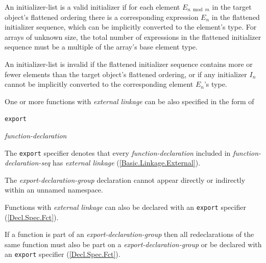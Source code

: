 \p An initializer-list is a valid initializer if for each element
\(E_{n \bmod m}\) in the target object's flattened ordering there is a
corresponding expression \(E_n\) in the flattened initializer sequence, which
can be implicitly converted to the element's type. For arrays of unknown size,
the total number of expressions in the flattened initializer sequence  must be a
multiple of the array's base element type.

\p An initializer-list is invalid if the flattened initializer sequence contains
more or fewer elements than the target object's flattened ordering, or if any
initializer \(I_n\) cannot be implicitly converted to the corresponding element
\(E_n\)'s type.



\p One or more functions with \textit{external linkage} can be also specified in the form of

\begin{grammar}
  \br
  \texttt{export} \terminal{\{}  \terminal{\}}\br

  \br
  \textit{function-declaration} 
\end{grammar}

\p The \texttt{export} specifier denotes that every \textit{function-declaration} included in \textit{function-declaration-seq} has \textit{external linkage} (\ref{Basic.Linkage.External}).

\p The \textit{export-declaration-group} declaration cannot appear directly or indirectly within an unnamed namespace.

\p Functions with \textit{external linkage} can also be declared with an \texttt{export} specifier (\ref{Decl.Spec.Fct}).

\p If a function is part of an \textit{export-declaration-group} then all redeclarations of the same function must also be part on a \textit{export-declaration-group} or be declared with an \texttt{export} specifier (\ref{Decl.Spec.Fct}).
